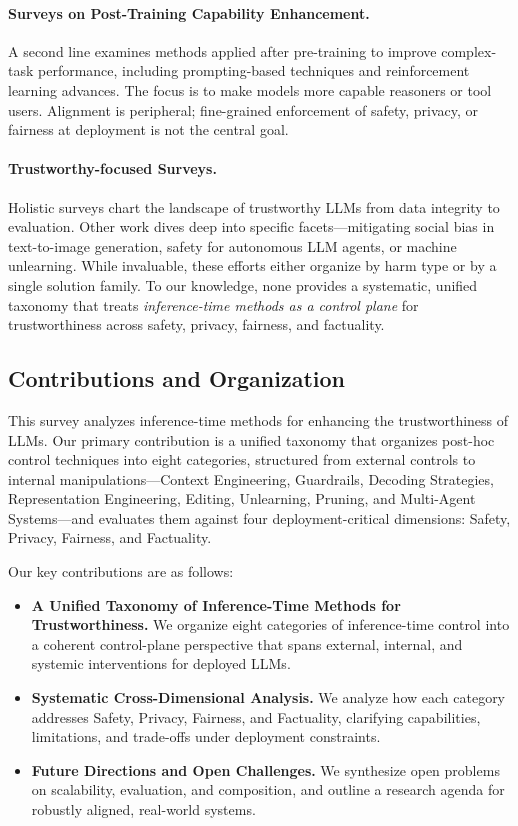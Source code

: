 {\paragraph{Surveys on Post-Training Capability Enhancement.}
A second line examines methods applied after pre-training to improve complex-task performance, including prompting-based techniques and reinforcement learning advances\citep{survey:post-training1, survey:post-training2}. The focus is to make models more capable reasoners or tool users. Alignment is peripheral; fine-grained enforcement of safety, privacy, or fairness at deployment is not the central goal.

\paragraph{Trustworthy-focused Surveys.}
Holistic surveys chart the landscape of trustworthy LLMs from data integrity to evaluation\citep{survey:trustworthy1, survey:trustworthy2}. Other work dives deep into specific facets—mitigating social bias in text-to-image generation\citep{survey:trustworthy_text2img}, safety for autonomous LLM agents\citep{survey:trustworthy_agents}, or machine unlearning\citep{survey:unlearning1, survey:unlearning2}. While invaluable, these efforts either organize by harm type or by a single solution family. To our knowledge, none provides a systematic, unified taxonomy that treats \emph{inference-time methods as a control plane} for trustworthiness across safety, privacy, fairness, and factuality.

\subsection{Contributions and Organization}
This survey analyzes inference-time methods for enhancing the trustworthiness of LLMs. Our primary contribution is a unified taxonomy that organizes post-hoc control techniques into eight categories, structured from external controls to internal manipulations—Context Engineering, Guardrails, Decoding Strategies, Representation Engineering, Editing, Unlearning, Pruning, and Multi-Agent Systems—and evaluates them against four deployment-critical dimensions: Safety, Privacy, Fairness, and Factuality.

Our key contributions are as follows:

\begin{itemize}
    \item \textbf{A Unified Taxonomy of Inference-Time Methods for Trustworthiness.} We organize eight categories of inference-time control into a coherent control-plane perspective that spans external, internal, and systemic interventions for deployed LLMs.
    \item \textbf{Systematic Cross-Dimensional Analysis.} We analyze how each category addresses Safety, Privacy, Fairness, and Factuality, clarifying capabilities, limitations, and trade-offs under deployment constraints.
    \item \textbf{Future Directions and Open Challenges.} We synthesize open problems on scalability, evaluation, and composition, and outline a research agenda for robustly aligned, real-world systems.
\end{itemize}

}
